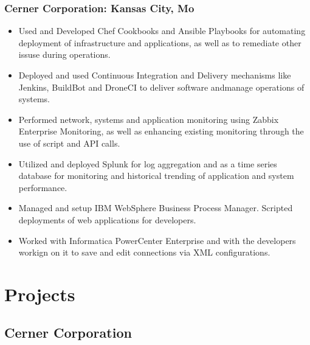 \documentclass{article}
\begin{document}
      \subsubsection{Cerner Corporation: Kansas City, Mo}

        \begin{scriptsize}
        \begin{itemize}

          \item Used and Developed Chef Cookbooks and Ansible Playbooks for
            automating deployment of infrastructure and applications, as well
            as to remediate other issuse during operations.

          \item Deployed and used Continuous Integration and Delivery
            mechanisms like Jenkins, BuildBot and DroneCI to deliver software
            andmanage operations of systems.

          \item Performed network, systems and application monitoring using
            Zabbix Enterprise Monitoring, as well as enhancing existing
            monitoring through the use of script and API calls.

          \item Utilized and deployed Splunk for log aggregation and as a time
            series database for monitoring and historical trending of
            application and system performance.

          \item Managed and setup IBM WebSphere Business Process Manager.
            Scripted deployments of web applications for developers.

          \item Worked with Informatica PowerCenter Enterprise and with the
            developers workign on it to save and edit connections via XML
            configurations.

        \end{itemize}
        \end{scriptsize}

  \section{Projects}

    \subsection{Cerner Corporation}
\end{document}
